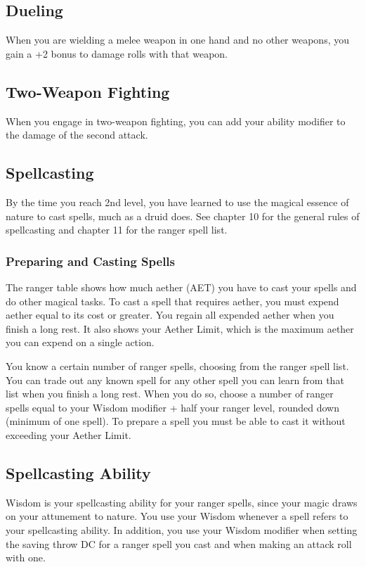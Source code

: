 \subsection{Dueling}

When you are wielding a melee weapon in one hand and no other weapons, you gain a +2 bonus to damage rolls with that weapon.

\subsection{Two-Weapon Fighting}

When you engage in two-weapon fighting, you can add your ability modifier to the damage of the second attack.

\subsection{Spellcasting}

By the time you reach 2nd level, you have learned to use the magical essence of nature to cast spells, much as a druid does. See chapter 10 for the general rules of spellcasting and chapter 11 for the ranger spell list.

\subsubsection{Preparing and Casting Spells}

The ranger table shows how much aether (AET) you have to cast your spells and do other magical tasks. To cast a spell that requires aether, you must expend aether equal to its cost or greater. You regain all expended aether when you finish a long rest. It also shows your Aether Limit, which is the maximum aether you can expend on a single action.

You know a certain number of ranger spells, choosing from the ranger spell list. You can trade out any known spell for any other spell you can learn from that list when you finish a long rest. When you do so, choose a number of ranger spells equal to your Wisdom modifier + half your ranger level, rounded down (minimum of one spell). To prepare a spell you must be able to cast it without exceeding your Aether Limit.

\subsection{Spellcasting Ability}

Wisdom is your spellcasting ability for your ranger spells, since your magic draws on your attunement to nature. You use your Wisdom whenever a spell refers to your spellcasting ability. In addition, you use your Wisdom modifier when setting the saving throw DC for a ranger spell you cast and when making an attack roll with one.


